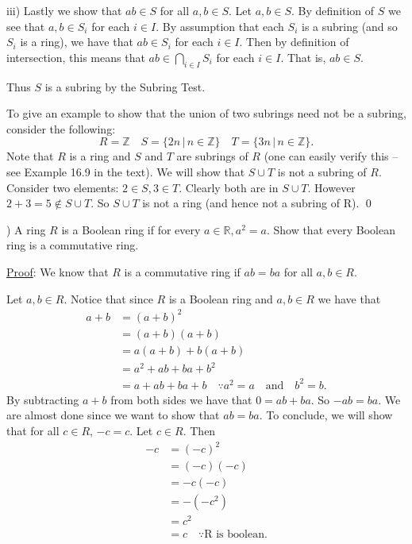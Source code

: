 \documentclass{article}
\begin{document}
iii) Lastly we show that $ab \in S$ for all $a, b \in S$. Let $a, b \in S$. By definition of $S$ we see that $a, b \in S_i$ for each $i \in I$. By assumption that each $S_i$ is a subring (and so $S_i$ is a ring), we have that $ab \in S_i$ for each $i \in I$. Then by definition of intersection, this means that $ab \in \underset{i \in I}{\bigcap} S_i$ for each $i \in I$. That is, $ab \in S$.

Thus $S$ is a subring by the Subring Test.

To give an example to show that the union of two subrings need not be a subring, consider the following:
$$R = \mathbb{Z} \quad S = \{2n \, \vert \, n \in \mathbb{Z} \} \quad T = \{3n \, \vert \, n \in \mathbb{Z} \}.$$
Note that $R$ is a ring and $S$ and $T$ are subrings of $R$ (one can easily verify this -- see Example 16.9 in the text). We will show that $S \cup T$ is not a subring of $R$. Consider two elements: $2 \in S, 3 \in T$. Clearly both are in $S \cup T$. However $2 + 3 = 5 \not \in S \cup T$. So $S \cup T$ is not a ring (and hence not a subring of R). \qed

) A ring $R$ is a Boolean ring if for every $a \in \mathbb{R}, a^2 = a$. Show that every Boolean ring is a commutative ring.

\underline{Proof}: We know that $R$ is a commutative ring if $ab = ba$ for all $a, b \in R$.

Let $a, b \in R$. Notice that since $R$ is a Boolean ring and $a, b \in R$ we have that
\begin{align*}
	a + b &= (a+b)^2 \\
	&= (a+b)(a+b) \\
	&= a(a+b) + b(a+b) \\
	&= a^2 + ab + ba + b^2 \\
	&= a + ab + ba + b \quad \because a^2 = a \quad \text{and} \quad b^2 = b.
\end{align*}
By subtracting $a + b$ from both sides we have that $0 = ab + ba$. So $-ab = ba$. We are almost done since we want to show that $ab = ba$. To conclude, we will show that for all $c \in R$, $-c = c$. Let $c \in R$. Then
\begin{align*}
	-c &= (-c)^2 \\
	&= (-c)(-c) \\
	&= -c(-c) \\
	&= -(-c^2) \\
	&= c^2 \\
	&= c \quad \because \text{R is boolean}.
\end{align*}
\end{document}
